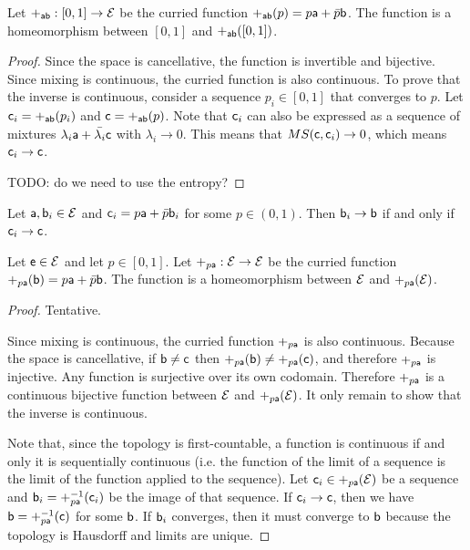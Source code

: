 \begin{conj}
	Let $+_{\ens[a]\ens[b]} : [0,1] \to \Ens$ be the curried function $+_{\ens[a]\ens[b]}(p) = p\ens[a] + \bar{p}\ens[b]$. The function is a homeomorphism between $[0,1]$ and $+_{\ens[a]\ens[b]}([0,1])$.
\end{conj}

\begin{proof}
	Since the space is cancellative, the function is invertible and bijective. Since mixing is continuous, the curried function is also continuous. To prove that the inverse is continuous, consider a sequence $p_i \in [0,1]$ that converges to $p$. Let $\ens[c]_i = +_{\ens[a]\ens[b]}(p_i)$ and $\ens[c] = +_{\ens[a]\ens[b]}(p)$. Note that $\ens[c]_i$ can also be expressed as a sequence of mixtures $\lambda_i \ens[a] + \bar{\lambda_i} \ens[c]$ with $\lambda_i \to 0$. This means that $MS(\ens[c], \ens[c]_i) \to 0$, which means $\ens[c]_i \to \ens[c]$.
	
	TODO: do we need to use the entropy?
\end{proof}

\begin{conj}
	Let $\ens[a], \ens[b]_i\in \Ens$ and $\ens[c]_i = p \ens[a] +\bar{p} \ens[b]_i$ for some $p \in (0,1)$. Then $\ens[b]_i \to \ens[b]$ if and only if $\ens[c]_i \to \ens[c]$. 
\end{conj}

\begin{conj}
	Let $\ens \in \Ens$ and let $p \in [0,1]$. Let $+_{p\ens[a]} : \Ens \to \Ens$ be the curried function $+_{p\ens[a]}(\ens[b]) = p\ens[a] + \bar{p}\ens[b]$. The function is a homeomorphism between $\Ens$ and $+_{p\ens[a]}(\Ens)$.
\end{conj}

\begin{proof}
	Tentative.
	
	Since mixing is continuous, the curried function $+_{p\ens[a]}$ is also continuous. Because the space is cancellative, if $\ens[b] \neq \ens[c]$ then $+_{p\ens[a]}(\ens[b]) \neq +_{p\ens[a]}(\ens[c])$, and therefore $+_{p\ens[a]}$ is injective. Any function is surjective over its own codomain. Therefore $+_{p\ens[a]}$ is a continuous bijective function between $\Ens$ and $+_{p\ens[a]}(\Ens)$. It only remain to show that the inverse is continuous.
	
	Note that, since the topology is first-countable, a function is continuous if and only it is sequentially continuous (i.e. the function of the limit of a sequence is the limit of the function applied to the sequence). Let $\ens[c]_i \in +_{p\ens[a]}(\Ens)$ be a sequence and $\ens[b]_i = +_{p\ens[a]}^{-1}(\ens[c]_i)$ be the image of that sequence. If $\ens[c]_i \to \ens[c]$, then we have $\ens[b] = +_{p\ens[a]}^{-1}(\ens[c])$ for some $\ens[b]$. If $\ens[b]_i$ converges, then it must converge to $\ens[b]$ because the topology is Hausdorff and limits are unique.
\end{proof}


